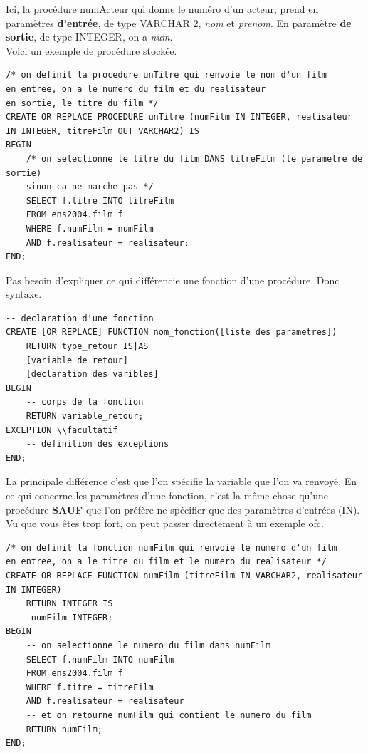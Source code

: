 \documentclass{report}
\begin{document}
Ici, la procédure numActeur qui donne le numéro d'un acteur, prend en paramètres \textbf{d'entrée}, de type VARCHAR 2, \textit{nom} et \textit{prenom}. En paramètre \textbf{de sortie}, de type INTEGER, on a \textit{num}.\\

Voici un exemple de procédure stockée.

\begin{lstlisting}[style=MySQLStyle]
/* on definit la procedure unTitre qui renvoie le nom d'un film
en entree, on a le numero du film et du realisateur
en sortie, le titre du film */
CREATE OR REPLACE PROCEDURE unTitre (numFilm IN INTEGER, realisateur IN INTEGER, titreFilm OUT VARCHAR2) IS
BEGIN
	/* on selectionne le titre du film DANS titreFilm (le parametre de sortie)
	sinon ca ne marche pas */
	SELECT f.titre INTO titreFilm
	FROM ens2004.film f
	WHERE f.numFilm = numFilm
	AND f.realisateur = realisateur;
END;
\end{lstlisting}

Pas besoin d'expliquer ce qui différencie une fonction d'une procédure. Donc syntaxe.
\begin{lstlisting}[style=MySQLStyle]
-- declaration d'une fonction
CREATE [OR REPLACE] FUNCTION nom_fonction([liste des parametres]) 
	RETURN type_retour IS|AS
	[variable de retour]
	[declaration des varibles]
BEGIN
	-- corps de la fonction
	RETURN variable_retour;
EXCEPTION \\facultatif
	-- definition des exceptions
END;
\end{lstlisting}
La principale différence c'est que l'on spécifie la variable que l'on va renvoyé.
En ce qui concerne les paramètres d'une fonction, c'est la même chose qu'une procédure \textbf{SAUF} que l'on préfère ne spécifier que des paramètres d'entrées (IN).\\
Vu que vous êtes trop fort, on peut passer directement à un exemple ofc.
\begin{lstlisting}[style=MySQLStyle]
/* on definit la fonction numFilm qui renvoie le numero d'un film
en entree, on a le titre du film et le numero du realisateur */
CREATE OR REPLACE FUNCTION numFilm (titreFilm IN VARCHAR2, realisateur IN INTEGER)
	RETURN INTEGER IS
	 numFilm INTEGER;
BEGIN
	-- on selectionne le numero du film dans numFilm
	SELECT f.numFilm INTO numFilm
	FROM ens2004.film f
	WHERE f.titre = titreFilm
	AND f.realisateur = realisateur
	-- et on retourne numFilm qui contient le numero du film
	RETURN numFilm;
END;
\end{lstlisting}
\end{document}
